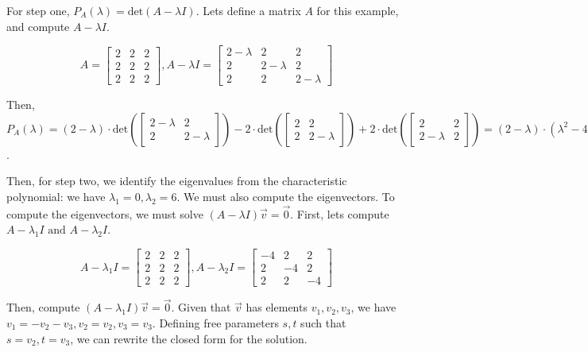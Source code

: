 \documentclass[11pt]{article}
\begin{document}
For step one, $P_A(\lambda)=\text{det}(A-\lambda I)$. Lets define a matrix $A$ for this example, and compute $A-\lambda I$.

$$A=\begin{bmatrix}2 & 2 & 2\\2 & 2 & 2\\2 & 2 & 2\end{bmatrix},A-\lambda I=\begin{bmatrix}2-\lambda & 2 & 2\\2 & 2-\lambda & 2\\2 & 2 & 2-\lambda\end{bmatrix}$$

Then, $P_A(\lambda)=(2-\lambda)\cdot\text{det}\left(\begin{bmatrix}2-\lambda & 2\\2 & 2-\lambda\end{bmatrix}\right)-2\cdot\text{det}\left(\begin{bmatrix}2 & 2\\2 & 2-\lambda\end{bmatrix}\right)+2\cdot\text{det}\left(\begin{bmatrix}2 & 2\\2-\lambda & 2\end{bmatrix}\right)=(2-\lambda)\cdot(\lambda^2-4\lambda)-2\cdot(-2\lambda)+2\cdot(2\lambda)=6\lambda^2-\lambda^3=-\lambda^2(\lambda-6)$.

Then, for step two, we identify the eigenvalues from the characteristic polynomial: we have $\lambda_1=0,\lambda_2=6$. We must also compute the eigenvectors. To compute the eigenvectors, we must solve $(A-\lambda I)\vec{v}=\vec{0}$. First, lets compute $A-\lambda_1I\text{ and }A-\lambda_2I$.

$$A-\lambda_1I=\begin{bmatrix}2 & 2 & 2\\2 & 2 & 2\\2 & 2 & 2\end{bmatrix},A-\lambda_2I=\begin{bmatrix}-4 & 2 & 2\\2 & -4 & 2\\2 & 2 & -4\end{bmatrix}$$

Then, compute $(A-\lambda_1I)\vec{v}=\vec{0}$. Given that $\vec{v}$ has elements $v_1,v_2,v_3$, we have $v_1=-v_2-v_3,v_2=v_2,v_3=v_3$. Defining free parameters $s,t$ such that $s=v_2,t=v_3$, we can rewrite the closed form for the solution.
\end{document}
